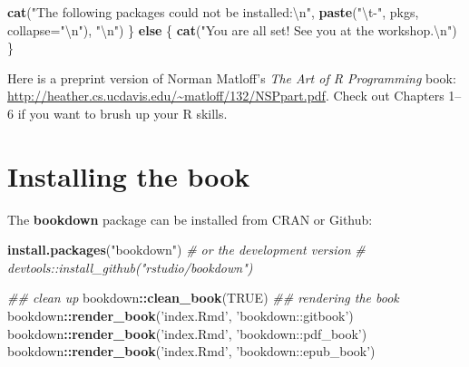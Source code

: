 \documentclass[12pt,]{book}
\newenvironment{Shaded}{\begin{snugshade}}{\end{snugshade}}
\newcommand{\CharTok}[1]{\textcolor[rgb]{0.31,0.60,0.02}{#1}}
\newcommand{\CommentTok}[1]{\textcolor[rgb]{0.56,0.35,0.01}{\textit{#1}}}
\newcommand{\ControlFlowTok}[1]{\textcolor[rgb]{0.13,0.29,0.53}{\textbf{#1}}}
\newcommand{\DataTypeTok}[1]{\textcolor[rgb]{0.13,0.29,0.53}{#1}}
\newcommand{\KeywordTok}[1]{\textcolor[rgb]{0.13,0.29,0.53}{\textbf{#1}}}
\newcommand{\NormalTok}[1]{#1}
\newcommand{\OperatorTok}[1]{\textcolor[rgb]{0.81,0.36,0.00}{\textbf{#1}}}
\newcommand{\OtherTok}[1]{\textcolor[rgb]{0.56,0.35,0.01}{#1}}
\newcommand{\StringTok}[1]{\textcolor[rgb]{0.31,0.60,0.02}{#1}}
\begin{document}
\begin{Shaded}
\begin{Highlighting}[]
  \KeywordTok{cat}\NormalTok{(}\StringTok{"The following packages could not be installed:}\CharTok{\textbackslash{}n}\StringTok{"}\NormalTok{,}
    \KeywordTok{paste}\NormalTok{(}\StringTok{"}\CharTok{\textbackslash{}t}\StringTok{-"}\NormalTok{, pkgs, }\DataTypeTok{collapse=}\StringTok{"}\CharTok{\textbackslash{}n}\StringTok{"}\NormalTok{), }\StringTok{"}\CharTok{\textbackslash{}n}\StringTok{"}\NormalTok{)}
\NormalTok{\} }\ControlFlowTok{else}\NormalTok{ \{}
  \KeywordTok{cat}\NormalTok{(}\StringTok{"You are all set! See you at the workshop.}\CharTok{\textbackslash{}n}\StringTok{"}\NormalTok{)}
\NormalTok{\}}
\end{Highlighting}
\end{Shaded}

Here is a preprint version of Norman Matloff's \emph{The Art of R Programming} book: \url{http://heather.cs.ucdavis.edu/~matloff/132/NSPpart.pdf}.
Check out Chapters 1--6 if you want to brush up your R skills.

\hypertarget{installing-the-book}{%
\section*{Installing the book}\label{installing-the-book}}

The \textbf{bookdown} package can be installed from CRAN or Github:

\begin{Shaded}
\begin{Highlighting}[]
\KeywordTok{install.packages}\NormalTok{(}\StringTok{"bookdown"}\NormalTok{)}
\CommentTok{# or the development version}
\CommentTok{# devtools::install_github("rstudio/bookdown")}

\CommentTok{## clean up }
\NormalTok{bookdown}\OperatorTok{::}\KeywordTok{clean_book}\NormalTok{(}\OtherTok{TRUE}\NormalTok{)}
\CommentTok{## rendering the book}
\NormalTok{bookdown}\OperatorTok{::}\KeywordTok{render_book}\NormalTok{(}\StringTok{'index.Rmd'}\NormalTok{, }\StringTok{'bookdown::gitbook'}\NormalTok{)}
\NormalTok{bookdown}\OperatorTok{::}\KeywordTok{render_book}\NormalTok{(}\StringTok{'index.Rmd'}\NormalTok{, }\StringTok{'bookdown::pdf_book'}\NormalTok{)}
\NormalTok{bookdown}\OperatorTok{::}\KeywordTok{render_book}\NormalTok{(}\StringTok{'index.Rmd'}\NormalTok{, }\StringTok{'bookdown::epub_book'}\NormalTok{)}
\end{Highlighting}
\end{Shaded}
\end{document}
